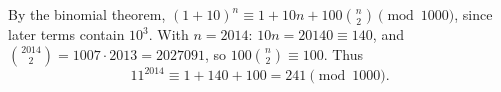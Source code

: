 By the binomial theorem, $(1+10)^n\equiv1+10n+100\binom n2\pmod{1000}$, since later terms contain $10^3$. With $n=2014$: $10n=20140\equiv140$, and $\binom{2014}2=1007\cdot2013=2027091$, so $100\binom n2\equiv100$. Thus
\[11^{2014}\equiv1+140+100=\boxed{241}\pmod{1000}.\]
